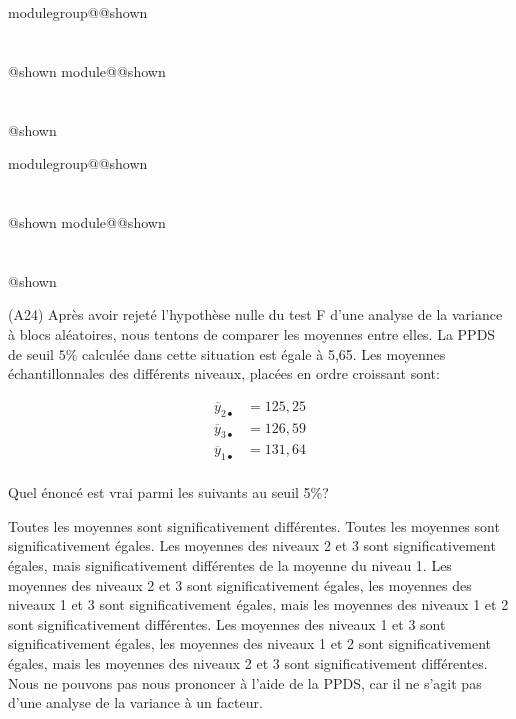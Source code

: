 \documentclass{Evaluation}
\makeatletter
\newcommand{\currentmodulekey}{}
\newcommand{\currentmoduletitle}{}
\newcommand{\currentgroupkey}{}
\newcommand{\currentgrouptitle}{}
\newcommand{\showmoduleifneeded}{%
  \ifx\currentgroupkey\empty\else
    \expandafter\ifx\csname modulegroup@\currentgroupkey @shown\endcsname\relax
      \section*{\currentgrouptitle}%
      \expandafter\gdef\csname modulegroup@\currentgroupkey @shown\endcsname{1}%
    \fi
  \fi
  \expandafter\ifx\csname module@\currentmodulekey @shown\endcsname\relax
    \section*{\currentmoduletitle}%
    \expandafter\gdef\csname module@\currentmodulekey @shown\endcsname{1}%
  \fi
}
\newenvironment{A23}{\showmoduleifneeded}{}
\newenvironment{A24}{\showmoduleifneeded}{}
\makeatother
\begin{document}
\begin{questions}
\begin{A23}
\begin{parts}
\end{parts}

\end{A23}

\begin{A24}
\question
(A24) 
Après avoir rejeté l'hypothèse nulle du test F d'une analyse de la variance à blocs aléatoires, nous tentons de comparer les moyennes entre elles.
La PPDS de seuil $5\%$ calculée dans cette situation est égale à 5,65. 
Les moyennes échantillonnales des différents niveaux, placées en ordre croissant sont:

\begin{align*}
    \overline{y}_{2\bullet}&=125,25\\
    \overline{y}_{3\bullet}&=126,59\\
    \overline{y}_{1\bullet}&=131,64\\
\end{align*}

Quel énoncé est vrai parmi les suivants au seuil 5\%?

\begin{checkboxes}
    \choice Toutes les moyennes sont significativement différentes.
    \choice Toutes les moyennes sont significativement égales.
    \choice Les moyennes des niveaux 2 et 3 sont significativement égales, mais significativement différentes de la moyenne du niveau 1.
    \correctchoice Les moyennes des niveaux 2 et 3 sont significativement égales, les moyennes des niveaux 1 et 3 sont significativement égales, mais les moyennes des niveaux 1 et 2 sont significativement différentes.
    \choice Les moyennes des niveaux 1 et 3 sont significativement égales, les moyennes des niveaux 1 et 2 sont significativement égales, mais les moyennes des niveaux 2 et 3 sont significativement différentes.
    \choice Nous ne pouvons pas nous prononcer à l'aide de la PPDS, car il ne s'agit pas d'une analyse de la variance à un facteur.
    \end{checkboxes}
\end{A24}


\end{questions}
\end{document}
